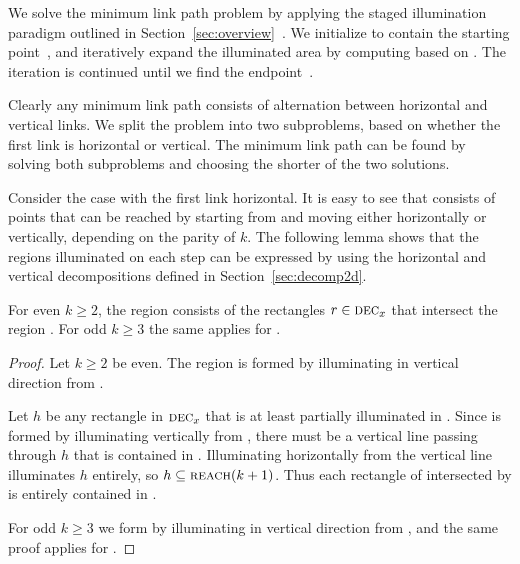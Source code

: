 \documentclass[english,gradu]{tktltiki2018}
\begin{document}
We solve the minimum link path problem by applying the staged illumination paradigm outlined in Section~\ref{sec:overview}~\cite{revisited}.
We initialize  to contain the starting point~\spt, and iteratively expand the illuminated area by computing  based on .
The iteration is continued until we find the endpoint~\ept.

Clearly any minimum link path consists of alternation between horizontal and vertical links.
We split the problem into two subproblems, based on whether the first link is horizontal or vertical.
The minimum link path can be found by solving both subproblems and choosing the shorter of the two solutions.

Consider the case with the first link horizontal.
It is easy to see that  consists of points that can be reached by starting from  and moving either horizontally or vertically, depending on the parity of $k$.
The following lemma shows that the regions illuminated on each step can be expressed by using the horizontal and vertical decompositions defined in Section~\ref{sec:decomp2d}.

\begin{lem}\label{lem:illum2d}
For even $k\ge 2$, the region  consists of the rectangles $r\in\textsc{dec}_{x}$ that intersect the region .
For odd $k\ge 3$ the same applies for .
\end{lem}
\begin{proof}
Let $k\ge 2$ be even.
The region  is formed by illuminating in vertical direction from .

Let $h$ be any rectangle in $\textsc{dec}_{x}$ that is at least partially illuminated in .
Since  is formed by illuminating vertically from , there must be a vertical line passing through $h$ that is contained in .
Illuminating horizontally from the vertical line illuminates $h$ entirely, so $h\subseteq\textsc{reach}(k+1)$.
Thus each rectangle of  intersected by  is entirely contained in .

For odd $k\ge 3$ we form  by illuminating in vertical direction from , and the same proof applies for .
\end{proof}
\end{document}
